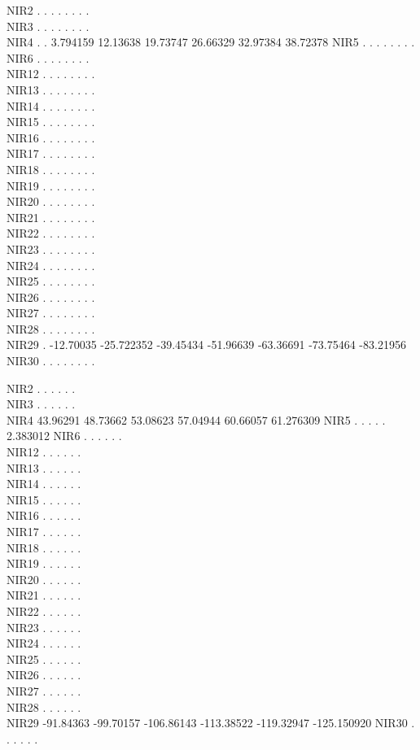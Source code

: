 \documentclass[
]{article}
\begin{document}
NIR2 . . . . . . . .\\
NIR3 . . . . . . . .\\
NIR4 . . 3.794159 12.13638 19.73747 26.66329 32.97384 38.72378 NIR5 . .
. . . . . .\\
NIR6 . . . . . . . .\\
NIR12 . . . . . . . .\\
NIR13 . . . . . . . .\\
NIR14 . . . . . . . .\\
NIR15 . . . . . . . .\\
NIR16 . . . . . . . .\\
NIR17 . . . . . . . .\\
NIR18 . . . . . . . .\\
NIR19 . . . . . . . .\\
NIR20 . . . . . . . .\\
NIR21 . . . . . . . .\\
NIR22 . . . . . . . .\\
NIR23 . . . . . . . .\\
NIR24 . . . . . . . .\\
NIR25 . . . . . . . .\\
NIR26 . . . . . . . .\\
NIR27 . . . . . . . .\\
NIR28 . . . . . . . .\\
NIR29 . -12.70035 -25.722352 -39.45434 -51.96639 -63.36691 -73.75464
-83.21956 NIR30 . . . . . . . .

NIR2 . . . . . .\\
NIR3 . . . . . .\\
NIR4 43.96291 48.73662 53.08623 57.04944 60.66057 61.276309 NIR5 . . . .
. 2.383012 NIR6 . . . . . .\\
NIR12 . . . . . .\\
NIR13 . . . . . .\\
NIR14 . . . . . .\\
NIR15 . . . . . .\\
NIR16 . . . . . .\\
NIR17 . . . . . .\\
NIR18 . . . . . .\\
NIR19 . . . . . .\\
NIR20 . . . . . .\\
NIR21 . . . . . .\\
NIR22 . . . . . .\\
NIR23 . . . . . .\\
NIR24 . . . . . .\\
NIR25 . . . . . .\\
NIR26 . . . . . .\\
NIR27 . . . . . .\\
NIR28 . . . . . .\\
NIR29 -91.84363 -99.70157 -106.86143 -113.38522 -119.32947 -125.150920
NIR30 . . . . . .
\end{document}
